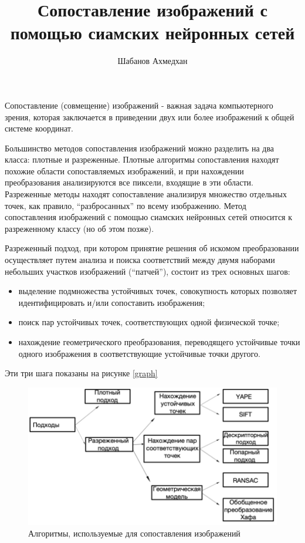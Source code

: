 \documentclass[a4paper,12pt]{article}
\title{Сопоставление изображений с помощью сиамских нейронных сетей}
\author{Шабанов Ахмедхан}
\date{}
\begin{document}
Сопоставление (совмещение) изображений - важная задача компьютерного зрения, которая заключается в приведении двух или более изображений к общей системе координат.

Большинство методов сопоставления изображений можно разделить на два класса: плотные и разреженные. Плотные алгоритмы сопоставления находят похожие области сопоставляемых изображений, и при нахождении преобразования анализируются все пиксели, входящие в эти области. Разреженные методы находят сопоставление анализируя множество отдельных точек, как правило, “разбросанных” по всему изображению. Метод сопоставления изображений с помощью сиамских нейронных сетей относится к разреженному классу (но об этом позже). 

Разреженный подход, при котором принятие решения об искомом преобразовании осуществляет путем анализа и поиска соответствий между двумя наборами небольших участков изображений (“патчей”), состоит из трех основных шагов:
\begin{itemize}
    \item выделение подмножества устойчивых точек, совокупность которых позволяет идентифицировать и/или сопоставить изображения; 
     \item поиск пар устойчивых точек, соответствующих одной физической точке; 
     \item нахождение геометрического преобразования, переводящего устойчивые точки одного изображения в соответствующие устойчивые точки другого. 
\end{itemize}

Эти три шага показаны на рисунке \ref{graph}
\begin{figure}[!h]
     \centering
     \includegraphics[width=130mm]{graph.png}
     \caption{Алгоритмы, используемые для сопоставления изображений}
     \label{models}
\end{figure}
\end{document}
